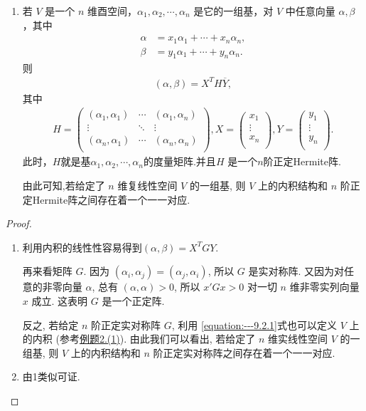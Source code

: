 \documentclass[../../main.tex]{subfiles}%
\begin{document}
\begin{theorem}
\begin{enumerate}
\item 若 \(V\) 是一个 \(n\) 维酉空间，\(\alpha_1,\alpha_2,\cdots,\alpha_n\) 是它的一组基，对 \(V\) 中任意向量 \(\alpha,\beta\)，其中
\begin{align*}
\alpha&=x_1\alpha_1+\cdots + x_n\alpha_n,\\
\beta&=y_1\alpha_1+\cdots + y_n\alpha_n.
\end{align*}
则
\begin{align*}
(\alpha,\beta)=X^TH\overline{Y},
\end{align*}
其中
\begin{align*}
H=\left( \begin{matrix}
\left( \alpha _1,\alpha _1 \right)&		\cdots&		\left( \alpha _1,\alpha _n \right)\\
\vdots&		\ddots&		\vdots\\
\left( \alpha _n,\alpha _1 \right)&		\cdots&		\left( \alpha _n,\alpha _n \right)\\
\end{matrix} \right) ,X=\left( \begin{array}{c}
x_1\\
\vdots\\
x_n\\
\end{array} \right) ,Y=\left( \begin{array}{c}
y_1\\
\vdots\\
y_n\\
\end{array} \right) .
\end{align*}
此时，$H$就是基\(\alpha_1,\alpha_2,\cdots,\alpha_n\)的度量矩阵.并且$H$ 是一个$n$阶正定Hermite阵.

由此可知,若给定了 $n$ 维复线性空间 $V$ 的一组基, 则 $V$ 上的内积结构和 $n$ 阶正定Hermite阵之间存在着一个一一对应. 
\end{enumerate} 
\end{theorem}
\begin{proof}
\begin{enumerate}
\item 利用内积的线性性容易得到$(\alpha,\beta)=X^TGY$.
 
再来看矩阵 $G$. 因为 $(\alpha_i, \alpha_j) = (\alpha_j, \alpha_i)$, 所以 $G$ 是实对称阵. 又因为对任意的非零向量 $\alpha$, 总有 $(\alpha, \alpha) > 0$, 所以 $x'Gx > 0$ 对一切 $n$ 维非零实列向量 $x$ 成立. 这表明 $G$ 是一个正定阵. 

反之, 若给定 $n$ 阶正定实对称阵 $G$, 利用 \eqref{equation:---9.2.1}式也可以定义 $V$ 上的内积 (参考\hyperref[example:一些常见的内积及内积空间]{例题2.(1)}). 由此我们可以看出, 若给定了 $n$ 维实线性空间 $V$ 的一组基, 则 $V$ 上的内积结构和 $n$ 阶正定实对称阵之间存在着一个一一对应. 

\item 由1类似可证.
\end{enumerate}

\end{proof}
\end{document}
